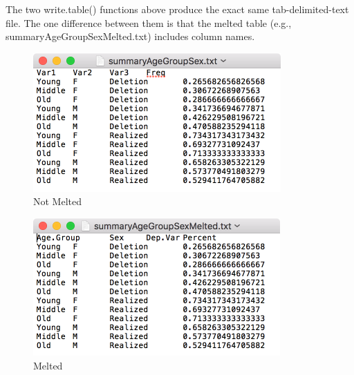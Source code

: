 \documentclass[
  10pt,
  letterpaper]{article}
\renewcommand\texttt[1]{{\ttfamily\color{BrickRed}#1}}
\begin{document}
The two \texttt{write.table()} functions above produce the exact same
tab-delimited-text file. The one difference between them is that the
melted table (e.g., \texttt{summaryAgeGroupSexMelted.txt}) includes
column names.

\begin{figure}

{\centering \includegraphics{images/summaryAgeGroupSex.png}

}

\caption{\label{fig-notmelted}Not Melted}

\end{figure}

\begin{figure}

{\centering \includegraphics{images/summaryAgeGroupSexMelted.png}

}

\caption{\label{fig-melted}Melted}

\end{figure}
\end{document}
